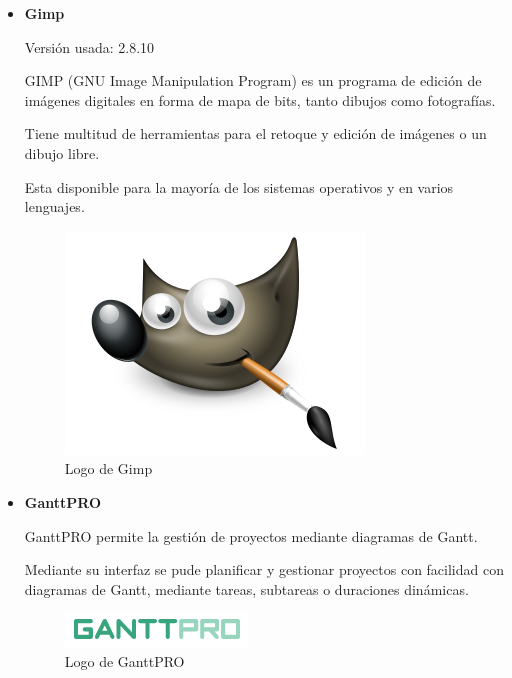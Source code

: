 \begin{itemize}
	\item \textbf{Gimp}
			
	Versión usada: 2.8.10
		
	GIMP (GNU Image Manipulation Program) \cite{gimp} es un programa de edición de imágenes digitales en forma de mapa de bits, tanto dibujos como fotografías. 

	Tiene multitud de herramientas para el retoque y edición de imágenes o un dibujo libre.

	Esta disponible para la mayoría de los sistemas operativos y en varios lenguajes.

	\bigskip
	\begin{figure}[h]
		\centering
		\includegraphics[width=0.3\linewidth]{../images/gimplogo}
		\caption[Logo de Gimp]{Logo de Gimp}
		\label{fig:gimplogo}
	\end{figure}
	
	
	\item \textbf{GanttPRO}
	
	GanttPRO \cite{ganttpro} permite la gestión de proyectos mediante diagramas de Gantt.

	Mediante su interfaz se pude planificar y gestionar proyectos con facilidad con diagramas de Gantt, mediante tareas, subtareas o duraciones dinámicas. 	

	\bigskip
	\begin{figure}[h]
		\centering
		\includegraphics[width=0.3\linewidth]{../images/ganttprologo}
		\caption[Logo de GanttPRO]{Logo de GanttPRO}
		\label{fig:ganttprologo}
	\end{figure}
				
\end{itemize}

